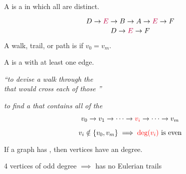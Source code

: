\begin{frame}{}
  \begin{definition}[Path (路径)]
    A  is a  in which all  are distinct.
  \end{definition}

  \pause
  \[
    D \to \textcolor{purple}{E} \to B \to A \to \textcolor{purple}{E} \to F
  \]
  \[
    D \to \textcolor{purple}{E} \to F
  \]
\end{frame}

\begin{frame}{}
  \begin{definition}
    A walk, trail, or path is  if $v_{0} = v_{m}$.
  \end{definition}

  \pause

  \pause
  \begin{definition}[Cycle]
    A  is a  with at least one edge.
  \end{definition}
\end{frame}

\begin{frame}{}
  \begin{center}
    {\it ``to devise a walk through the  \\
    that would cross each of those  ''}


    \pause
    {\it to find a  that contains all  of the }
  \end{center}
\end{frame}

\begin{frame}{}
  \[
    v_{0} \to v_{1} \to \dots \to \textcolor{red}{v_{i}} \to \dots \to v_{m}
  \]


  \pause
  \vspace{-0.50cm}
  \[
    v_{i} \notin \{v_{0}, v_{m}\} \implies
    \textcolor{red}{\text{deg}(v_{i})} \text{ is even}
  \]
\end{frame}

\begin{frame}{}
  \begin{lemma}
    If a graph has ,
    then  vertices have an  degree.
  \end{lemma}

  \pause

  \begin{center}
    4 vertices of odd degree $\implies$ has no Eulerian trails
  \end{center}
\end{frame}

